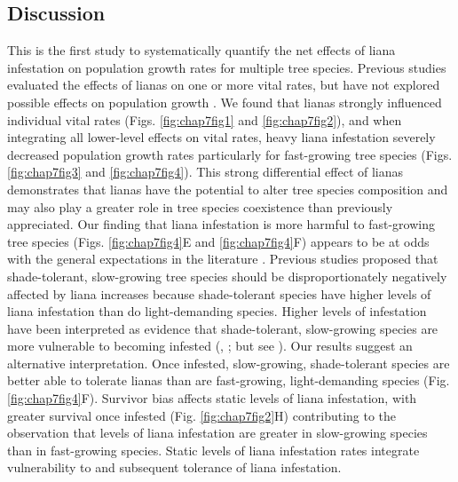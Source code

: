 \documentclass[b5paper,justified]{tufte-book} %
\begin{document}
\begin{fullwidth}
\section{Discussion}
This is the first study to systematically quantify the net effects of liana infestation on population growth rates for multiple tree species. Previous studies evaluated the effects of lianas on one or more vital rates, but have not explored possible effects on population growth \citep{Schnitzer2005, Ingwell2010, Alvarez-Cansino2015, Wright2015,  Martinez-Izquierdo2016}. We found that lianas strongly influenced individual vital rates (Figs. \ref{fig:chap7fig1} and \ref{fig:chap7fig2}), and when integrating all lower-level effects on vital rates, heavy liana infestation severely decreased population growth rates particularly for fast-growing tree species (Figs. \ref{fig:chap7fig3} and \ref{fig:chap7fig4}).  This strong differential effect of lianas demonstrates that lianas have the potential to alter tree species composition and may also play a greater role in tree species coexistence than previously appreciated. 
Our finding that liana infestation is more harmful to fast-growing tree species (Figs. \ref{fig:chap7fig4}E and \ref{fig:chap7fig4}F) appears to be at odds with the general expectations in the literature \citep{Putz1984a, Clark1990, Schnitzer2000, Heijden2008, Heijden2009, Schnitzer2010}. Previous studies proposed that shade-tolerant, slow-growing tree species should be disproportionately negatively affected by liana increases \citep{Schnitzer2002} because shade-tolerant species have higher levels of liana infestation than do light-demanding species. Higher levels of infestation have been interpreted as evidence that shade-tolerant, slow-growing species are more vulnerable to becoming infested (\citealt{Heijden2008}, \citealt{Clark1990}; but see \citealt{Ingwell2010}). Our results suggest an alternative interpretation. Once infested, slow-growing, shade-tolerant species are better able to tolerate lianas than are fast-growing, light-demanding species (Fig. \ref{fig:chap7fig4}F). Survivor bias affects static levels of liana infestation, with greater survival once infested (Fig. \ref{fig:chap7fig2}H) contributing to the observation that levels of liana infestation are greater in slow-growing species than in fast-growing species. Static levels of liana infestation rates integrate vulnerability to and subsequent tolerance of liana infestation.  


\end{fullwidth}
\end{document}
